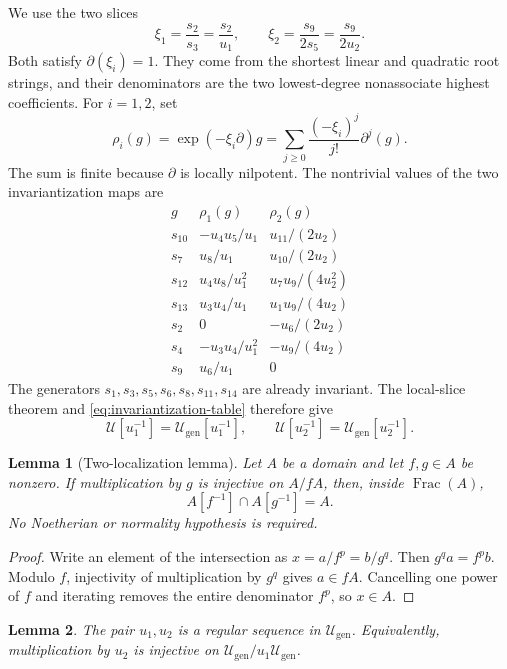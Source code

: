 \documentclass[11pt,reqno]{amsart}
\numberwithin{equation}{section}
\newtheorem{lemma}[lemma]{Lemma}
\theoremstyle{remark}
\newcommand{\UR}{\mathscr U}
\newcommand{\Ugen}{\mathscr U_{\mathrm{gen}}}
\newcommand{\Frac}{\operatorname{Frac}}
\begin{document}
We use the two slices
\[ \xi_1=\frac{s_2}{s_3}=\frac{s_2}{u_1}, \qquad \xi_2=\frac{s_9}{2s_5}=\frac{s_9}{2u_2}. \]
Both satisfy $\partial(\xi_i)=1$.  They come from the shortest linear
and quadratic root strings, and their denominators are the two lowest-degree
nonassociate highest coefficients.  For $i=1,2$, set
\[ \rho_i(g)=\exp(-\xi_i\partial)g =\sum_{j\ge0}\frac{(-\xi_i)^j}{j!}\partial^j(g). \]
The sum is finite because $\partial$ is locally nilpotent.  The
nontrivial values of the two invariantization maps are
\begin{equation}
\label{eq:invariantization-table}
\begin{array}{c|c|c}
 g&\rho_1(g)&\rho_2(g)\\ \hline
 s_{10}&-u_4u_5/u_1&u_{11}/(2u_2)\\
 s_7&u_8/u_1&u_{10}/(2u_2)\\
 s_{12}&u_4u_8/u_1^2&u_7u_9/(4u_2^2)\\
 s_{13}&u_3u_4/u_1&u_1u_9/(4u_2)\\
 s_2&0&-u_6/(2u_2)\\
 s_4&-u_3u_4/u_1^2&-u_9/(4u_2)\\
 s_9&u_6/u_1&0
\end{array}
\end{equation}
The generators $s_1,s_3,s_5,s_6,s_8,s_{11},s_{14}$ are already
invariant.  The local-slice theorem \cite[Chapter~1]{Freudenburg} and \eqref{eq:invariantization-table}
therefore give
\begin{equation}
\label{eq:two-localized-equalities}
 \UR[u_1^{-1}]=\Ugen[u_1^{-1}],
 \qquad
 \UR[u_2^{-1}]=\Ugen[u_2^{-1}].
\end{equation}

\begin{lemma}[Two-localization lemma]
\label{lem:two-localization}
Let $A$ be a domain and let $f,g\in A$ be nonzero.  If multiplication
by $g$ is injective on $A/fA$, then, inside $\Frac(A)$,
\[ A[f^{-1}]\cap A[g^{-1}]=A. \]
No Noetherian or normality hypothesis is required.
\end{lemma}

\begin{proof}
Write an element of the intersection as
$x=a/f^p=b/g^q$.  Then $g^qa=f^pb$.  Modulo $f$, injectivity of
multiplication by $g^q$ gives $a\in fA$.  Cancelling one power of
$f$ and iterating removes the entire denominator $f^p$, so $x\in A$.
\end{proof}

\begin{lemma}
\label{lem:Ugen-regular-sequence}
The pair $u_1,u_2$ is a regular sequence in $\Ugen$.  Equivalently,
multiplication by $u_2$ is injective on $\Ugen/u_1\Ugen$.
\end{lemma}
\end{document}
